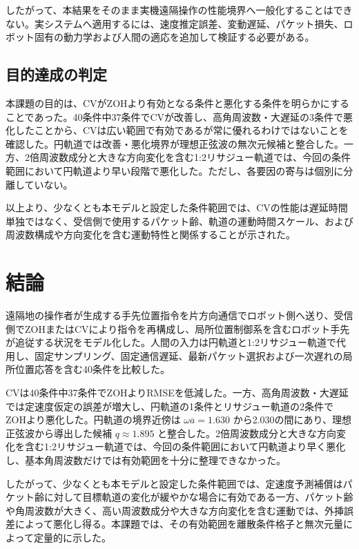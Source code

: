 \documentclass[11pt,a4paper]{article}
\begin{document}
したがって、本結果をそのまま実機遠隔操作の性能境界へ一般化することはできない。実システムへ適用するには、速度推定誤差、変動遅延、パケット損失、ロボット固有の動力学および人間の適応を追加して検証する必要がある。

\subsection{目的達成の判定}

本課題の目的は、CVがZOHより有効となる条件と悪化する条件を明らかにすることであった。40条件中37条件でCVが改善し、高角周波数・大遅延の3条件で悪化したことから、CVは広い範囲で有効であるが常に優れるわけではないことを確認した。円軌道では改善・悪化境界が理想正弦波の無次元候補と整合した。一方、2倍周波数成分と大きな方向変化を含む1:2リサジュー軌道では、今回の条件範囲において円軌道より早い段階で悪化した。ただし、各要因の寄与は個別に分離していない。

以上より、少なくとも本モデルと設定した条件範囲では、CVの性能は遅延時間単独ではなく、受信側で使用するパケット齢、軌道の運動時間スケール、および周波数構成や方向変化を含む運動特性と関係することが示された。

\section{結論}

遠隔地の操作者が生成する手先位置指令を片方向通信でロボット側へ送り、受信側でZOHまたはCVにより指令を再構成し、局所位置制御系を含むロボット手先が追従する状況をモデル化した。人間の入力は円軌道と1:2リサジュー軌道で代用し、固定サンプリング、固定通信遅延、最新パケット選択および一次遅れの局所位置応答を含む40条件を比較した。

CVは40条件中37条件でZOHよりRMSEを低減した。一方、高角周波数・大遅延では定速度仮定の誤差が増大し、円軌道の1条件とリサジュー軌道の2条件でZOHより悪化した。円軌道の境界近傍は $\omega\overline a=1.630$ から2.030の間にあり、理想正弦波から導出した候補 $q\approx1.895$ と整合した。2倍周波数成分と大きな方向変化を含む1:2リサジュー軌道では、今回の条件範囲において円軌道より早く悪化し、基本角周波数だけでは有効範囲を十分に整理できなかった。

したがって、少なくとも本モデルと設定した条件範囲では、定速度予測補償はパケット齢に対して目標軌道の変化が緩やかな場合に有効である一方、パケット齢や角周波数が大きく、高い周波数成分や大きな方向変化を含む運動では、外挿誤差によって悪化し得る。本課題では、その有効範囲を離散条件格子と無次元量によって定量的に示した。
\end{document}
